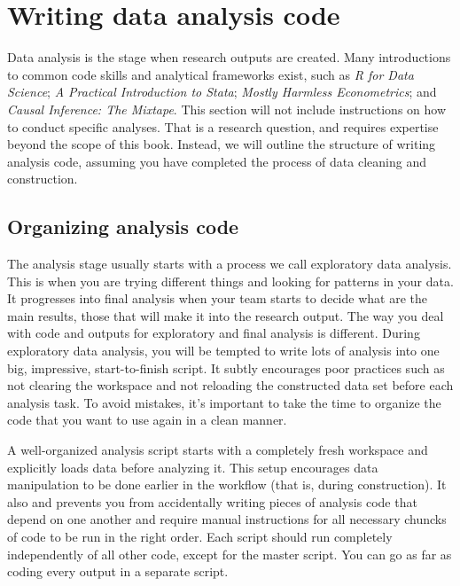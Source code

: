 
\section{Writing data analysis code}

Data analysis is the stage when research outputs are created. 
Many introductions to common code skills and analytical frameworks exist, such as
\textit{R for Data Science};
\textit{A Practical Introduction to Stata};
\textit{Mostly Harmless Econometrics}; 
and \textit{Causal Inference: The Mixtape}.
This section will not include instructions on how to conduct specific analyses.
That is a research question, and requires expertise beyond the scope of this book.
Instead, we will outline the structure of writing analysis code,
assuming you have completed the process of data cleaning and construction.

\subsection{Organizing analysis code}

The analysis stage usually starts with a process we call exploratory data analysis.
This is when you are trying different things and looking for patterns in your data. 
It progresses into final analysis when your team starts to decide what are the main results, 
those that will make it into the research output.
The way you deal with code and outputs for exploratory and final analysis is different.
During exploratory data analysis, 
you will be tempted to write lots of analysis into one big, impressive, start-to-finish script. 
It subtly encourages poor practices such as not clearing the workspace and not reloading the constructed data set before each analysis task. 
To avoid mistakes, it's important to take the time 
to organize the code that you want to use again in a clean manner.

A well-organized analysis script starts with a completely fresh workspace 
and explicitly loads data before analyzing it.
This setup encourages data manipulation to be done earlier in the workflow 
(that is, during construction).
It also and prevents you from accidentally writing pieces of analysis code that depend on one another 
and require manual instructions for all necessary chuncks of code to be run in the right order.
Each script should run completely independently of all other code, 
except for the master script.
You can go as far as coding every output in a separate script.

